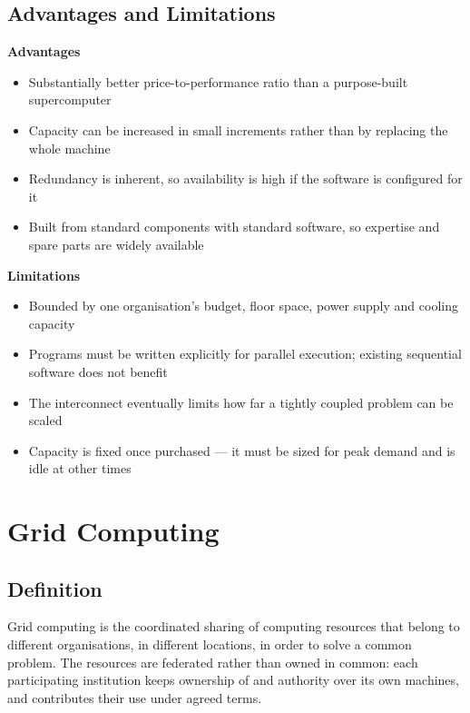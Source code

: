 \subsection{Advantages and Limitations}

\textbf{Advantages}
\begin{itemize}
  \item Substantially better price-to-performance ratio than a purpose-built
        supercomputer
  \item Capacity can be increased in small increments rather than by
        replacing the whole machine
  \item Redundancy is inherent, so availability is high if the software is
        configured for it
  \item Built from standard components with standard software, so expertise
        and spare parts are widely available
\end{itemize}

\textbf{Limitations}
\begin{itemize}
  \item Bounded by one organisation's budget, floor space, power supply and
        cooling capacity
  \item Programs must be written explicitly for parallel execution; existing
        sequential software does not benefit
  \item The interconnect eventually limits how far a tightly coupled problem
        can be scaled
  \item Capacity is fixed once purchased --- it must be sized for peak demand
        and is idle at other times
\end{itemize}

\section{Grid Computing}

\subsection{Definition}

Grid computing is the coordinated sharing of computing resources that belong
to different organisations, in different locations, in order to solve a
common problem. The resources are federated rather than owned in common: each
participating institution keeps ownership of and authority over its own
machines, and contributes their use under agreed terms.

